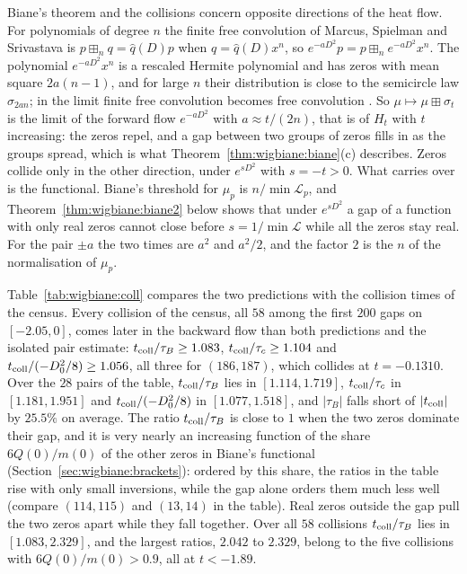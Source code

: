 \begin{remark}\label{rem:wigbiane:direction}
Biane's theorem and the collisions concern opposite directions of the heat flow. For polynomials of degree $n$ the finite free convolution of Marcus, Spielman and Srivastava \cite{MSS22} is $p\boxplus_nq=\hat q(D)p$ when $q=\hat q(D)x^n$, so $e^{-aD^2}p=p\boxplus_ne^{-aD^2}x^n$. The polynomial $e^{-aD^2}x^n$ is a rescaled Hermite polynomial \cite{MSS22} and has zeros with mean square $2a(n-1)$, and for large $n$ their distribution is close to the semicircle law $\sigma_{2an}$; in the limit finite free convolution becomes free convolution \cite{MSS22}. So $\mu\mapsto\mu\boxplus\sigma_t$ is the limit of the forward flow $e^{-aD^2}$ with $a\approx t/(2n)$, that is of $H_t$ with $t$ increasing: the zeros repel, and a gap between two groups of zeros fills in as the groups spread, which is what Theorem~\ref{thm:wigbiane:biane}(c) describes. Zeros collide only in the other direction, under $e^{sD^2}$ with $s=-t>0$. What carries over is the functional. Biane's threshold for $\mu_p$ is $n/\min\mathcal L_p$, and Theorem~\ref{thm:wigbiane:biane2} below shows that under $e^{sD^2}$ a gap of a function with only real zeros cannot close before $s=1/\min\mathcal L$ while all the zeros stay real. For the pair $\pm a$ the two times are $a^2$ and $a^2/2$, and the factor $2$ is the $n$ of the normalisation of $\mu_p$.
\end{remark}

Table~\ref{tab:wigbiane:coll} compares the two predictions with the collision times of the census. Every collision of the census, all $58$ among the first $200$ gaps on $[-2.05,0]$, comes later in the backward flow than both predictions and the isolated pair estimate: $t_{\rm coll}/\tau_B\ge1.083$, $t_{\rm coll}/\tau_c\ge1.104$ and $t_{\rm coll}/(-D_0^2/8)\ge1.056$, all three for $(186,187)$, which collides at $t=-0.1310$. Over the $28$ pairs of the table, $t_{\rm coll}/\tau_B$ lies in $[1.114,1.719]$, $t_{\rm coll}/\tau_c$ in $[1.181,1.951]$ and $t_{\rm coll}/(-D_0^2/8)$ in $[1.077,1.518]$, and $|\tau_B|$ falls short of $|t_{\rm coll}|$ by $25.5\%$ on average. The ratio $t_{\rm coll}/\tau_B$ is close to $1$ when the two zeros dominate their gap, and it is very nearly an increasing function of the share $6Q(0)/m(0)$ of the other zeros in Biane's functional (Section~\ref{sec:wigbiane:brackets}): ordered by this share, the ratios in the table rise with only small inversions, while the gap alone orders them much less well (compare $(114,115)$ and $(13,14)$ in the table). Real zeros outside the gap pull the two zeros apart while they fall together. Over all $58$ collisions $t_{\rm coll}/\tau_B$ lies in $[1.083,2.329]$, and the largest ratios, $2.042$ to $2.329$, belong to the five collisions with $6Q(0)/m(0)>0.9$, all at $t<-1.89$.

